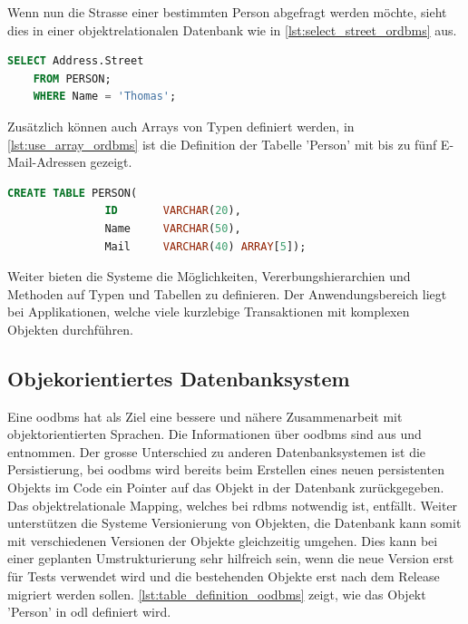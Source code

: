 Wenn nun die Strasse einer bestimmten Person abgefragt werden möchte, sieht dies in einer objektrelationalen Datenbank wie in \autoref{lst:select_street_ordbms} aus.

\begin{lstlisting}[language=SQL, caption=Abfrage in objektrelationalem Datenbanksystem, label=lst:select_street_ordbms]  
    SELECT Address.Street
    FROM PERSON;
    WHERE Name = 'Thomas';
\end{lstlisting}

Zusätzlich können auch Arrays von Typen definiert werden, in \autoref{lst:use_array_ordbms} ist die Definition der Tabelle 'Person' mit 
bis zu fünf E-Mail-Adressen gezeigt.

\begin{lstlisting}[language=SQL, caption=Verwendung von Array in objektrelationalem Datenbanksystem, label=lst:use_array_ordbms]  
    CREATE TABLE PERSON(
               ID       VARCHAR(20),
               Name     VARCHAR(50),
               Mail     VARCHAR(40) ARRAY[5]);
\end{lstlisting}

Weiter bieten die Systeme die Möglichkeiten, Vererbungshierarchien und Methoden auf Typen und Tabellen zu definieren. Der Anwendungsbereich 
liegt bei Applikationen, welche viele kurzlebige Transaktionen mit komplexen Objekten durchführen.

\subsection{Objekorientiertes Datenbanksystem}\label{object_db}
Eine \gls{oodbms} hat als Ziel eine bessere und nähere Zusammenarbeit mit objektorientierten Sprachen. 
Die Informationen über \gls{oodbms} sind aus \cite{limited2010introduction} und \cite{oodbms_details} entnommen. Der grosse Unterschied zu anderen Datenbanksystemen
ist die Persistierung, bei \gls{oodbms} wird bereits beim Erstellen eines neuen persistenten Objekts im Code ein Pointer auf das Objekt in der Datenbank zurückgegeben. 
Das objektrelationale Mapping, welches bei \gls{rdbms} notwendig ist, entfällt. 
Weiter unterstützen die Systeme Versionierung von Objekten, die Datenbank kann somit mit verschiedenen Versionen der Objekte gleichzeitig umgehen. 
Dies kann bei einer geplanten Umstrukturierung sehr hilfreich sein, wenn die neue Version erst für Tests verwendet wird und die bestehenden Objekte erst nach dem 
Release migriert werden sollen. \autoref{lst:table_definition_oodbms} zeigt, wie das Objekt 'Person' in \gls{odl} definiert wird.

